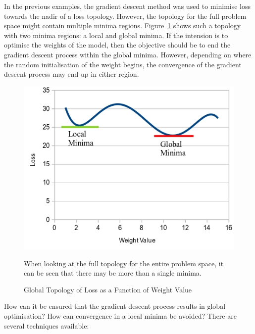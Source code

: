 \noindent
In the previous examples, the gradient descent method was used to minimise loss towards the nadir of a loss topology. However, the topology for the full problem space might contain multiple minima regions. Figure~\ref{fig:minima_maxima} shows such a topology with two minima regions: a local and global minima. If the intension is to optimise the weights of the model, then the objective should be to end the gradient descent process within the global minima. However, depending on where the random initialisation of the weight begins, the convergence of the gradient descent process may end up in either region. \\

\begin{figure}[h]
	\centering
	\includegraphics[scale=0.45]{Figures/loss_minima_maxima.jpg}
	\caption{Global Topology of Loss as a Function of Weight Value} {When looking at the full topology for the entire problem space, it can be seen that there may be more than a single minima. }
	\label{fig:minima_maxima}
\end{figure}

\noindent
How can it be ensured that the gradient descent process results in global optimisation? How can convergence in a local minima be avoided? There are several techniques available:

